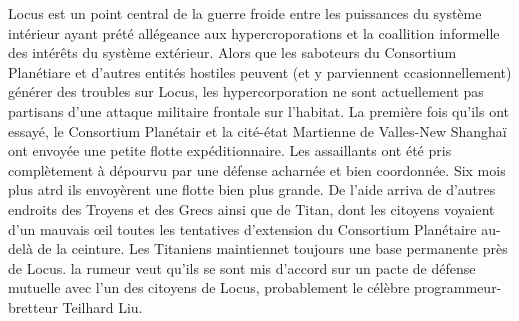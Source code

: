                                                                Locus est un point central de la guerre froide entre les puissances du système intérieur ayant prété allégeance aux hypercroporations et la coallition informelle des intérêts du système extérieur. Alors que les saboteurs du Consortium Planétiare et d'autres entités hostiles peuvent (et y parviennent ccasionnellement) générer des troubles sur Locus, les hypercorporation ne sont actuellement pas partisans d'une attaque militaire frontale sur l'habitat. La première fois qu'ils ont essayé, le Consortium Planétair et la cité-état Martienne de Valles-New Shanghaï ont envoyée une petite flotte expéditionnaire. Les assaillants ont été pris complètement à dépourvu par une défense acharnée et bien coordonnée. Six mois plus atrd ils envoyèrent une flotte bien plus grande. De l'aide arriva de d'autres endroits des Troyens et des Grecs ainsi que de Titan, dont les citoyens voyaient d'un mauvais œil toutes les tentatives d'extension du Consortium Planétaire au-delà de la ceinture. Les Titaniens maintiennet toujours une base permanente près de Locus. la rumeur veut qu'ils se sont mis d'accord sur un pacte de défense mutuelle avec l'un des citoyens de Locus, probablement le célèbre programmeur-bretteur Teilhard Liu. 

